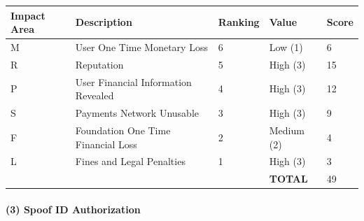 \documentclass[12pt]{article} %
\begin{document}
{\begin{center}
\begin{tabular}{ | l | l | l | l | l |}
  \hline
  \textbf{Impact Area} & \textbf{Description} & \textbf{Ranking} & \textbf{Value} & \textbf{Score}
  \\ \hline
  M & User One Time Monetary Loss			& 6	& Low (1)		& 6
  \\ \hline
  R & Reputation		& 5	& High (3)		& 15
  \\ \hline
  P & User Financial Information Revealed		& 4	& High (3)		& 12
  \\ \hline
  S & Payments Network Unusable					& 3	& High (3)		& 9
  \\ \hline
  F & Foundation One Time Financial Loss	& 2	& Medium (2)	& 4
  \\ \hline
  L & Fines and Legal Penalties						& 1	& High (3)		& 3
  \\ \hline
  & & & \textbf{TOTAL} & 49
  \\ \hline
\end{tabular}
\end{center}
\label{tab:severityBruteForceIdAddressLookup}

\paragraph{(3) Spoof ID Authorization }

}
\end{document}
